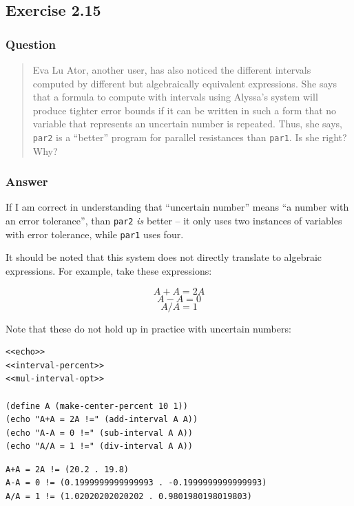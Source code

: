 \documentclass[final,fleqn,titlepage,twoside]{article}
\begin{document}
\subsection{Exercise 2.15}
\label{sec:org3fc1210}
\subsubsection{Question}
\label{sec:org184baa5}
\begin{quote}
Eva Lu Ator, another user, has also noticed the different intervals computed by
different but algebraically equivalent expressions. She says that a formula to
compute with intervals using Alyssa's system will produce tighter error bounds
if it can be written in such a form that no variable that represents an
uncertain number is repeated. Thus, she says, \texttt{par2} is a ``better''
program for parallel resistances than \texttt{par1}. Is she right? Why?
\end{quote}

\subsubsection{Answer}
\label{sec:orged277f5}
If I am correct in understanding that ``uncertain number'' means ``a number with an
error tolerance'', than \texttt{par2} \emph{is} better -- it only uses two
instances of variables with error tolerance, while \texttt{par1} uses four.

It should be noted that this system does not directly translate to algebraic
expressions. For example, take these expressions:

\[A + A = 2A\]
\[A - A = 0\]
\[A / A = 1\]

Note that these do not hold up in practice with uncertain numbers:


\begin{verbatim}
<<echo>>
<<interval-percent>>
<<mul-interval-opt>>

(define A (make-center-percent 10 1))
(echo "A+A = 2A !=" (add-interval A A))
(echo "A-A = 0 !=" (sub-interval A A))
(echo "A/A = 1 !=" (div-interval A A))
\end{verbatim}

\begin{verbatim}
A+A = 2A != (20.2 . 19.8) 
A-A = 0 != (0.1999999999999993 . -0.1999999999999993) 
A/A = 1 != (1.02020202020202 . 0.9801980198019803) 
\end{verbatim}
\end{document}
